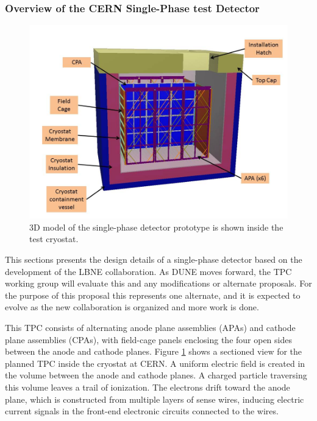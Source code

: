 \subsubsection{Overview of the CERN Single-Phase test Detector}
\begin{figure}[htb]
\centering
\begin{minipage}[b]{1.0\textwidth}
\begin{center}
\includegraphics[width=.75\textwidth]{figures/TPC-3D-section.jpg}
\end{center}
\end{minipage}
\caption{\small 3D model of the single-phase detector prototype is shown inside the test cryostat.}
\label{fig:CERNdet-overview}
\end{figure}

This sections presents the design details of a single-phase detector based on the development of the LBNE collaboration. As DUNE moves forward, the TPC working group will evaluate this and any modifications or alternate proposals. For the purpose of this proposal this represents one alternate, and it is expected to evolve as the new collaboration is organized and more work is done. 

This TPC consists of alternating anode plane assemblies (APAs) and cathode plane assemblies (CPAs), with field-cage panels enclosing the four open sides between the anode and cathode planes.  Figure  \ref{fig:CERNdet-overview} shows a sectioned view for the planned TPC inside the cryostat at CERN.  A uniform electric field is created in the volume between the anode and cathode planes. A charged particle traversing this volume leaves a trail of ionization. The electrons drift toward the anode plane, which is constructed from multiple layers of sense wires, inducing electric current signals in the front-end electronic circuits connected to the wires.

